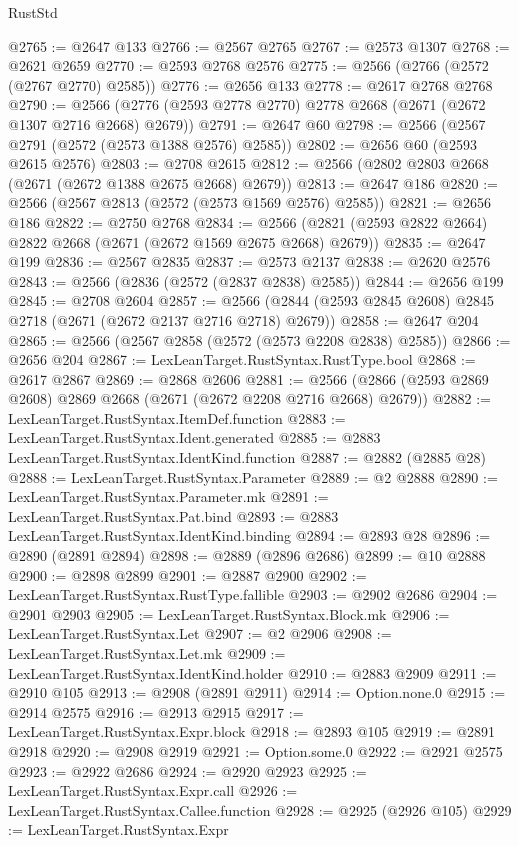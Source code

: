 \begin{lexlean}{RustStd}
\begin{coremodule}
@2765 := @2647 @133
@2766 := @2567 @2765
@2767 := @2573 @1307
@2768 := @2621 @2659
@2770 := @2593 @2768 @2576
@2775 := @2566 (@2766 (@2572 (@2767 @2770) @2585))
@2776 := @2656 @133
@2778 := @2617 @2768 @2768
@2790 := @2566 (@2776 (@2593 @2778 @2770) @2778 @2668 (@2671 (@2672 @1307 @2716 @2668) @2679))
@2791 := @2647 @60
@2798 := @2566 (@2567 @2791 (@2572 (@2573 @1388 @2576) @2585))
@2802 := @2656 @60 (@2593 @2615 @2576)
@2803 := @2708 @2615
@2812 := @2566 (@2802 @2803 @2668 (@2671 (@2672 @1388 @2675 @2668) @2679))
@2813 := @2647 @186
@2820 := @2566 (@2567 @2813 (@2572 (@2573 @1569 @2576) @2585))
@2821 := @2656 @186
@2822 := @2750 @2768
@2834 := @2566 (@2821 (@2593 @2822 @2664) @2822 @2668 (@2671 (@2672 @1569 @2675 @2668) @2679))
@2835 := @2647 @199
@2836 := @2567 @2835
@2837 := @2573 @2137
@2838 := @2620 @2576
@2843 := @2566 (@2836 (@2572 (@2837 @2838) @2585))
@2844 := @2656 @199
@2845 := @2708 @2604
@2857 := @2566 (@2844 (@2593 @2845 @2608) @2845 @2718 (@2671 (@2672 @2137 @2716 @2718) @2679))
@2858 := @2647 @204
@2865 := @2566 (@2567 @2858 (@2572 (@2573 @2208 @2838) @2585))
@2866 := @2656 @204
@2867 := LexLeanTarget.RustSyntax.RustType.bool
@2868 := @2617 @2867
@2869 := @2868 @2606
@2881 := @2566 (@2866 (@2593 @2869 @2608) @2869 @2668 (@2671 (@2672 @2208 @2716 @2668) @2679))
@2882 := LexLeanTarget.RustSyntax.ItemDef.function
@2883 := LexLeanTarget.RustSyntax.Ident.generated
@2885 := @2883 LexLeanTarget.RustSyntax.IdentKind.function
@2887 := @2882 (@2885 @28)
@2888 := LexLeanTarget.RustSyntax.Parameter
@2889 := @2 @2888
@2890 := LexLeanTarget.RustSyntax.Parameter.mk
@2891 := LexLeanTarget.RustSyntax.Pat.bind
@2893 := @2883 LexLeanTarget.RustSyntax.IdentKind.binding
@2894 := @2893 @28
@2896 := @2890 (@2891 @2894)
@2898 := @2889 (@2896 @2686)
@2899 := @10 @2888
@2900 := @2898 @2899
@2901 := @2887 @2900
@2902 := LexLeanTarget.RustSyntax.RustType.fallible
@2903 := @2902 @2686
@2904 := @2901 @2903
@2905 := LexLeanTarget.RustSyntax.Block.mk
@2906 := LexLeanTarget.RustSyntax.Let
@2907 := @2 @2906
@2908 := LexLeanTarget.RustSyntax.Let.mk
@2909 := LexLeanTarget.RustSyntax.IdentKind.holder
@2910 := @2883 @2909
@2911 := @2910 @105
@2913 := @2908 (@2891 @2911)
@2914 := Option.none.{0}
@2915 := @2914 @2575
@2916 := @2913 @2915
@2917 := LexLeanTarget.RustSyntax.Expr.block
@2918 := @2893 @105
@2919 := @2891 @2918
@2920 := @2908 @2919
@2921 := Option.some.{0}
@2922 := @2921 @2575
@2923 := @2922 @2686
@2924 := @2920 @2923
@2925 := LexLeanTarget.RustSyntax.Expr.call
@2926 := LexLeanTarget.RustSyntax.Callee.function
@2928 := @2925 (@2926 @105)
@2929 := LexLeanTarget.RustSyntax.Expr

\end{coremodule}
\end{lexlean}
